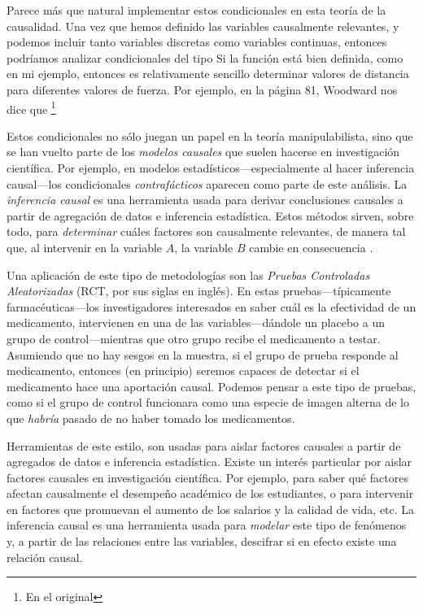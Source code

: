 Parece más que natural implementar estos condicionales en
esta teoría de la causalidad. Una vez que hemos definido las
variables causalmente relevantes, y podemos
incluir tanto variables discretas como variables
continuas, entonces podríamos analizar condicionales del tipo
 Si la función está bien definida,
como en mi ejemplo, entonces es relativamente sencillo
determinar valores de distancia para diferentes valores de
fuerza. Por ejemplo, en la página 81, Woodward nos dice que
\footnote{ 
    En el original 
}

Estos condicionales no sólo juegan un papel en la teoría
manipulabilista, sino que se han vuelto parte de los
\emph{modelos causales} que suelen hacerse en investigación
científica. Por ejemplo, en modelos
estadísticos---especialmente al hacer inferencia
causal---los condicionales \emph{contrafácticos} aparecen
como parte de este análisis. La \emph{inferencia causal} es
una herramienta usada para derivar conclusiones causales a
partir de agregación de datos e inferencia estadística.
Estos métodos sirven, sobre todo, para \emph{determinar}
cuáles factores son causalmente relevantes, de manera tal
que, al intervenir en la variable $A$, la variable $B$
cambie en consecuencia \parencite{Pearl2016, Pearl2018,
llaudet2023}. 

Una aplicación de este tipo de metodologías son las \emph{Pruebas Controladas
Aleatorizadas} (RCT, por sus siglas en inglés). En estas
pruebas---típicamente farmacéuticas---los investigadores
interesados en saber cuál es la efectividad de un
medicamento, intervienen en una de las variables---dándole
un placebo a un grupo de control---mientras que otro grupo
recibe el medicamento a testar. Asumiendo que no hay sesgos
en la muestra, si el grupo de prueba responde al
medicamento, entonces (en principio) seremos capaces de
detectar si el medicamento hace una aportación causal.
Podemos pensar a este tipo de pruebas, como si el grupo de
control funcionara como una especie de imagen alterna de lo
que \emph{habría} pasado de no haber tomado los
medicamentos. 

Herramientas de este estilo, son usadas para aislar factores
causales a partir de agregados de datos e inferencia
estadística. Existe un interés particular por aislar
factores causales en investigación científica. Por
ejemplo, para saber qué factores afectan causalmente el
desempeño académico de los estudiantes, o para intervenir en
factores que promuevan el aumento de los salarios y la
calidad de vida, etc. La inferencia causal es una
herramienta usada para \emph{modelar} este tipo de fenómenos
y, a partir de las relaciones entre las variables, descifrar
si en efecto existe una relación causal.

